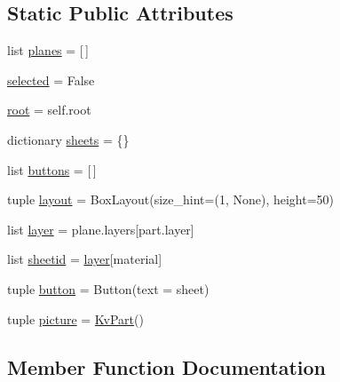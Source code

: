 \subsection*{Static Public Attributes}
\begin{DoxyCompactItemize}
\item 
list \hyperlink{classcamcam__layout_1_1_cam_cam_aa75dfb49cf795fe55538fd5fedd085e4}{planes} = \mbox{[}$\,$\mbox{]}
\item 
\hyperlink{classcamcam__layout_1_1_cam_cam_a02351504f971107694efd2766372b628}{selected} = False
\item 
\hyperlink{classcamcam__layout_1_1_cam_cam_a0706ff671a864b8258ef606b4a53bfbf}{root} = self.\+root
\item 
dictionary \hyperlink{classcamcam__layout_1_1_cam_cam_a320eacfe25d7621ee065adac1a038b79}{sheets} = \{\}
\item 
list \hyperlink{classcamcam__layout_1_1_cam_cam_a61b884fcd41fdf82ee5558d7e422fc6b}{buttons} = \mbox{[}$\,$\mbox{]}
\item 
tuple \hyperlink{classcamcam__layout_1_1_cam_cam_ad68196dc02bf35acc187e607b1079882}{layout} = Box\+Layout(size\+\_\+hint=(1, None), height=50)
\item 
list \hyperlink{classcamcam__layout_1_1_cam_cam_a5e3add24ff41a90068b83cc1c73176e0}{layer} = plane.\+layers\mbox{[}part.\+layer\mbox{]}
\item 
list \hyperlink{classcamcam__layout_1_1_cam_cam_a5154c29272561706f3f08f058fe4e39d}{sheetid} = \hyperlink{classcamcam__layout_1_1_cam_cam_a5e3add24ff41a90068b83cc1c73176e0}{layer}\mbox{[}\textquotesingle{}material\textquotesingle{}\mbox{]}
\item 
tuple \hyperlink{classcamcam__layout_1_1_cam_cam_a94449317084eb1abc4707e2bc3c2ae95}{button} = Button(text = sheet)
\item 
tuple \hyperlink{classcamcam__layout_1_1_cam_cam_ad0bee697a9661370ca2d19b1c0ed6b79}{picture} = \hyperlink{classcamcam__layout_1_1_kv_part}{Kv\+Part}()
\end{DoxyCompactItemize}


\subsection{Member Function Documentation}
\hypertarget{classcamcam__layout_1_1_cam_cam_aae15201c08000c6d0a01b947d0e99757}{}
